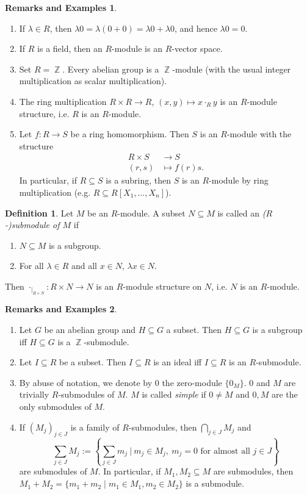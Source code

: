 \documentclass[12pt,a4paper]{report}
\theoremstyle{definition}
\newtheorem{defn}[theorem]{Definition}
\newtheorem*{remex}{Remarks and Examples}
\theoremstyle{num.custom-title}
\DeclareMathOperator{\Z}{\mathbb{Z}}
\DeclareMathOperator{\sse}{\subseteq}
\begin{document}
\begin{remex}\ 
\begin{enumerate}
\item If $\lambda \in R$, then $\lambda 0 = \lambda (0+0) = \lambda 0 + \lambda 0$, and hence $\lambda 0 = 0$.
\item If $R$ is a field, then an $R$-module is an $R$-vector space.
\item Set $R=\Z$. Every abelian group is a $\Z$-module (with the usual integer multiplication as scalar multiplication).
\item The ring multiplication $R \times R \to R$, $(x,y) \mapsto x \cdot_R y$ is an $R$-module structure, i.e. $R$ is an $R$-module.
\item Let $f: R \to S$ be a ring homomorphism. Then $S$ is an $R$-module with the structure
\begin{align*}
R \times S &\to S \\
(r,s) &\mapsto f(r)s.
\end{align*}
In particular, if $R \sse S$ is a subring, then $S$ is an $R$-module by ring multiplication (e.g. $R \sse R[X_1,...,X_n]$).
\end{enumerate}
\end{remex}

\begin{defn}
Let $M$ be an $R$-module. A subset $N \sse M$ is called an \emph{($R$-)submodule of $M$} if 
\begin{enumerate}
\item $N \sse M$ is a subgroup.
\item For all $\lambda \in R$ and all $x \in N$, $\lambda x \in N$.
\end{enumerate}
Then $\cdot_{|_{R \times N}} : R \times N \to N$ is an $R$-module structure on $N$, i.e. $N$ is an $R$-module.
\end{defn}

\begin{remex}\ 
\begin{enumerate}
\item Let $G$ be an abelian group and $H \sse G$ a subset. Then $H \sse G$ is a subgroup iff $H \sse G$ is a $\Z$-submodule.
\item Let $I \sse R$ be a subset. Then $I \sse R$ is an ideal iff $I \sse R$ is an $R$-submodule.
\item By abuse of notation, we denote by $0$ the zero-module $\{0_M\}$. $0$ and $M$ are trivially $R$-submodules of $M$. $M$ is called \emph{simple} if $0 \neq M$ and $0,M$ are the only submodules of $M$.
\item If $(M_j)_{j \in J}$ is a family of $R$-submodules, then $\bigcap_{j \in J} M_j$ and
\[
\sum_{j \in J} M_j := \left\{ \sum_{j \in J} m_j \ \Bigg| \ m_j \in M_j, \ m_j = 0 \text{ for almost all } j \in J \right\}
\]
are submodules of $M$. In particular, if $M_1,M_2 \sse M$ are submodules, then $M_1+M_2 = \{m_1 + m_2 \mid m_1 \in M_1, m_2 \in M_2\}$ is a submodule.
\end{enumerate}
\end{remex}
\end{document}

